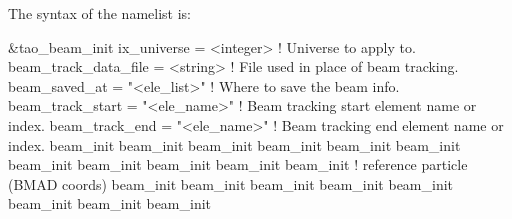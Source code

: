 {{{{{{{{The syntax of the  namelist is:
\begin{example}
  &tao_beam_init
    ix_universe                 = <integer>    ! Universe to apply to.
    beam_track_data_file               = <string>     ! File used in place of beam tracking.
    beam_saved_at               = "<ele_list>" ! Where to save the beam info.
    beam_track_start            = "<ele_name>" ! Beam tracking start element name or index.
    beam_track_end              = "<ele_name>" ! Beam tracking end element name or index.
    beam_init%
    beam_init%
    beam_init%
    beam_init%
    beam_init%
    beam_init%
    beam_init%
    beam_init%
    beam_init%
    beam_init%
    beam_init%
                                               !   reference particle (BMAD coords)
    beam_init%
    beam_init%
    beam_init%
    beam_init%
    beam_init%
    beam_init%
    beam_init%
    beam_init%

\end{example}}}}}}}}}
